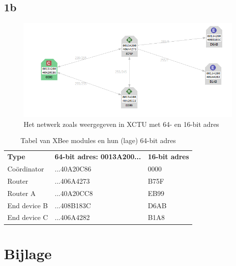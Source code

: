 \documentclass[12pt]{article}
\begin{document}
\subsection*{1b}

\begin{figure}[h]
\begin{center}
\includegraphics[scale=.8]{API_network.png}
\caption{Het netwerk zoals weergegeven in XCTU met 64- en 16-bit adres}
\label{fig:api_net}
\end{center}
\end{figure}
\begin{table}[h]
\begin{center}
\begin{tabular}{lll}
\rowcolor[HTML]{656565} 
\textbf{Type} 	  & \textbf{64-bit adres: 0013A200...} & \textbf{16-bit adres}\\
Co\"{o}rdinator   & ...40A20C86       &  0000	\\
Router            & ...406A4273       &  B75F  \\
Router A      	  & ...40A20CC8       &  EB99  \\
End device B      	  & ...408B183C       & D6AB   \\
End device C      	  & ...406A4282       &	B1A8	\\               
\end{tabular}
\end{center}
\caption{Tabel van XBee modules en hun (lage) 64-bit adres}
\label{tab:info1}
\end{table}
\clearpage

\section{Bijlage}
\end{document}
